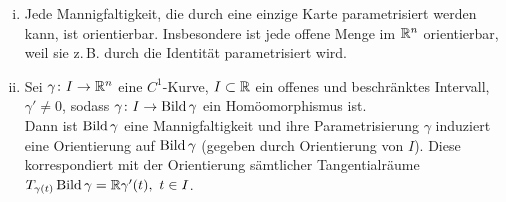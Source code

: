\documentclass[skript.tex]{subfiles}
\begin{document}
	\begin{bsp}\hfill\vspace{-.5\baselineskip}
		\begin{enumerate}[(i)]
			\item Jede Mannigfaltigkeit, die durch eine einzige Karte parametrisiert werden kann, ist orientierbar. Insbesondere ist jede offene Menge im ${\mathbb{R}^n}$ orientierbar, weil sie z.\,B. durch die Identität parametrisiert wird.
			\item Sei $\gamma \colon I \to {\mathbb{R}^n}$ eine $C^1$-Kurve, $I\subset\mathbb{R}$ ein offenes und beschränktes Intervall, $\gamma' \neq 0$, sodass $\gamma \colon I \to \operatorname{Bild}\gamma$ ein Homöomorphismus ist.\\ Dann ist $\operatorname{Bild}\gamma$ eine Mannigfaltigkeit und ihre Parametrisierung $\gamma$ induziert eine Orientierung auf $\operatorname{Bild}\gamma$ (gegeben durch Orientierung von $I$). Diese korrespondiert mit der Orientierung sämtlicher Tangentialräume
			$T_{\gamma(t)}\operatorname{Bild}\gamma = \mathbb{R}\gamma'(t),\ t \in I$.
		\end{enumerate}
	\end{bsp}
\end{document}
